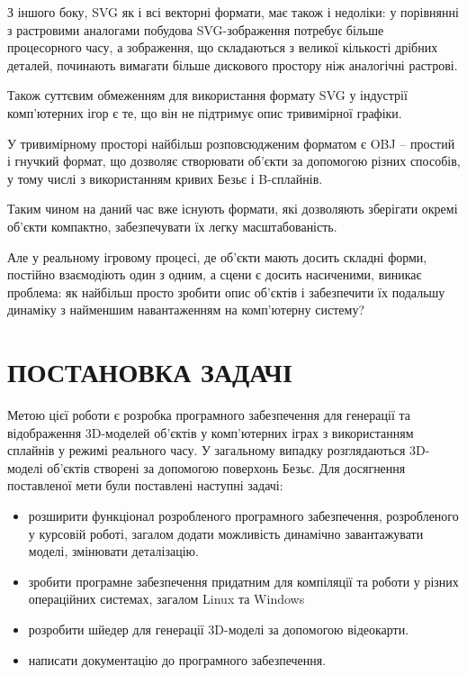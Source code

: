 \let\mypdfximage\pdfximage\def\pdfximage{\immediate\mypdfximage}\documentclass[14pt,a4paper]{extarticle}
\theoremstyle{definition}
\renewcommand{\[}{\begin{singlespace}\begin{equation*}}
\renewcommand{\]}{\end{equation*}\end{singlespace}}
\renewcommand{\+}{\discretionary{\mbox{\scriptsize$\hookleftarrow$}}{}{}}
\begin{document}
З іншого боку, SVG як і всі векторні формати, має також і недоліки: у порівнянні з растровими аналогами побудова SVG-зображення потребує більше процесорного часу, а зображення, що складаються з великої кількості дрібних деталей, починають вимагати більше дискового простору ніж аналогічні растрові. 

Також суттєвим обмеженням для використання формату SVG у індустрії комп'ютерних ігор є те, що він не підтримує опис тривимірної графіки.

У тривимірному просторі найбільш розповсюдженим форматом є OBJ – простий і гнучкий формат, що дозволяє створювати об'єкти за допомогою різних способів, у тому числі з використанням кривих Безьє і B-сплайнів.
 
Таким чином на даний час вже існують формати, які дозволяють зберігати окремі об'єкти компактно, забезпечувати їх легку масштабованість.

Але у реальному ігровому процесі, де об'єкти мають досить складні форми,  постійно взаємодіють один з одним, а сцени є досить насиченими, виникає проблема: як найбільш просто зробити опис об'єктів і забезпечити їх подальшу динаміку з найменшим навантаженням на комп'ютерну систему?

\section*{ПОСТАНОВКА ЗАДАЧІ}

Метою цієї роботи є розробка програмного забезпечення для генерації та відображення 3D-моделей об'єктів у комп'ютерних іграх з використанням сплайнів у режимі реального часу. У загальному випадку розглядаються 3D-моделі об'єктів створені за допомогою поверхонь Безьє. Для досягнення поставленої мети були поставлені наступні задачі:

\begin{itemize}
\item розширити функціонал розробленого програмного забезпечення, розробленого у курсовій роботі, загалом додати можливість динамічно завантажувати моделі, змінювати деталізацію.
\item зробити програмне забезпечення придатним для компіляції та роботи у різних операційних системах, загалом Linux та Windows
\item розробити шйедер для генерації 3D-моделі за допомогою відеокарти.
\item написати документацію до програмного забезпечення.
\end{itemize}
\end{document}
